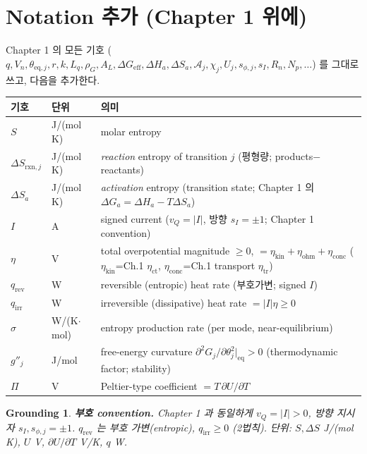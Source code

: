 \documentclass[11pt,a4paper]{article}
\newtheorem*{groundingbox}{Grounding}
\newcommand{\eff}{\mathrm{eff}}
\newcommand{\eq}{\mathrm{eq}}
\newcommand{\rxn}{\mathrm{rxn}}
\newcommand{\rev}{\mathrm{rev}}
\newcommand{\irr}{\mathrm{irr}}
\newcommand{\kin}{\mathrm{kin}}
\newcommand{\ohm}{\mathrm{ohm}}
\newcommand{\conc}{\mathrm{conc}}
\begin{document}
\section{Notation 추가 (Chapter 1 위에)}\label{sec:notation}
Chapter 1 의 모든 기호 ($q,V_n,\theta_{\eq,j},r,k,L_q,\rho_G,A_L,\Delta G_\eff,\Delta H_a,
\Delta S_a,\mathcal A_j,\chi_j,U_j,s_{\phi,j},s_I,R_n,N_p,\dots$) 를 그대로 쓰고, 다음을 추가한다.
\begin{longtable}{p{} p{} p{}}
\toprule 기호 & 단위 & 의미 \\ \midrule \endhead
$S$ & J/(mol K) & molar entropy \\
$\Delta S_{\rxn,j}$ & J/(mol K) & \emph{reaction} entropy of transition $j$ (평형량; products$-$reactants) \\
$\Delta S_a$ & J/(mol K) & \emph{activation} entropy (transition state; Chapter 1 의 $\Delta G_a=\Delta H_a-T\Delta S_a$) \\
$I$ & A & signed current ($v_Q=|I|$, 방향 $s_I=\pm1$; Chapter 1 convention) \\
$\eta$ & V & total overpotential magnitude $\ge0$, $=\eta_\kin+\eta_\ohm+\eta_\conc$ ($\eta_\kin$=Ch.1 $\eta_{\mathrm{ct}}$, $\eta_\conc$=Ch.1 transport $\eta_{\mathrm{tr}}$) \\
$q_\rev$ & W & reversible (entropic) heat rate (부호가변; signed $I$) \\
$q_\irr$ & W & irreversible (dissipative) heat rate $=|I|\eta\ge0$ \\
$\sigma$ & W/(K$\cdot$mol) & entropy production rate (per mode, near-equilibrium) \\
$g''_j$ & J/mol & free-energy curvature $\partial^2 G_j/\partial\theta_j^2|_{\eq}>0$ (thermodynamic factor; stability) \\
$\Pi$ & V & Peltier-type coefficient $=T\,\partial U/\partial T$ \\
\bottomrule
\end{longtable}
\begin{groundingbox}
\textbf{부호 convention.} Chapter 1 과 동일하게 $v_Q=|I|>0$, 방향 지시자 $s_I,s_{\phi,j}=\pm1$.
$q_\rev$ 는 부호 가변(entropic), $q_\irr\ge0$ (2법칙). 단위: $S,\Delta S$ J/(mol K),
$U$ V, $\partial U/\partial T$ V/K, $q$ W.
\end{groundingbox}

\end{document}
